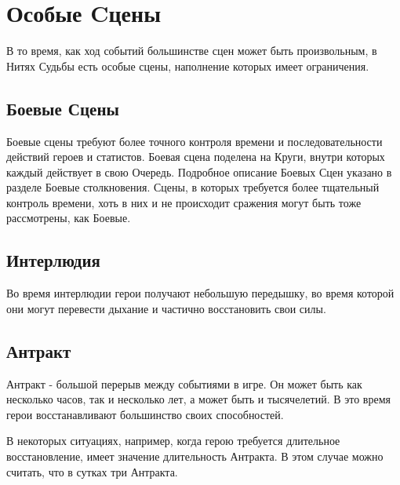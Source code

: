 \section{Особые Cцены}
В то время, как ход событий большинстве сцен может быть произвольным, в Нитях Судьбы есть особые сцены, наполнение которых имеет ограничения.
\subsection{Боевые Сцены}
Боевые сцены требуют более точного контроля времени и последовательности действий героев и статистов. Боевая сцена поделена на Круги, внутри которых каждый действует в свою Очередь. Подробное описание Боевых Сцен указано в разделе Боевые столкновения.
\newline Сцены, в которых требуется более тщательный контроль времени, хоть в них и не происходит сражения могут быть тоже рассмотрены, как Боевые.
\subsection{Интерлюдия}
Во время интерлюдии герои получают небольшую передышку, во время которой они могут перевести дыхание и частично восстановить свои силы.
\subsection{Антракт}
Антракт - большой перерыв между событиями в игре. Он может быть как несколько часов, так и несколько лет, а может быть и тысячелетий. В это время герои восстанавливают большинство своих способностей.
\begin{tcolorbox}
В некоторых ситуациях, например, когда герою требуется длительное восстановление, имеет значение длительность Антракта. В этом случае можно считать, что в сутках три Антракта.
\end{tcolorbox}
